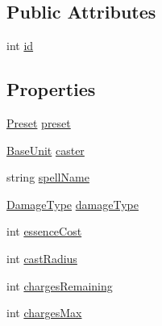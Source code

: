 \subsection*{Public Attributes}
\begin{DoxyCompactItemize}
\item 
int \mbox{\hyperlink{class_spell_abb6d2a96c06ac7e85d1e315e257a106a}{id}}
\end{DoxyCompactItemize}
\subsection*{Properties}
\begin{DoxyCompactItemize}
\item 
\mbox{\hyperlink{class_spell_a5520e850e7000a6156b3456672b72ed1}{Preset}} \mbox{\hyperlink{class_spell_a5f19de819de784c8f273d52417009f54}{preset}}
\item 
\mbox{\hyperlink{class_base_unit}{Base\+Unit}} \mbox{\hyperlink{class_spell_a682bd6dfb1e3dd20ef44711ca10c0f05}{caster}}
\item 
string \mbox{\hyperlink{class_spell_a57762a8a1ff7a3b2c901fedc517035e9}{spell\+Name}}
\item 
\mbox{\hyperlink{class_spell_a3e228beaf92e2c035e6599aaf0ac2d2a}{Damage\+Type}} \mbox{\hyperlink{class_spell_ac71023a2630008b8f2e428caf7cc9251}{damage\+Type}}
\item 
int \mbox{\hyperlink{class_spell_a213cc910c2cc43b2ac27d4524c90722c}{essence\+Cost}}
\item 
int \mbox{\hyperlink{class_spell_aa868e1b844177f20440e0b15f7d42692}{cast\+Radius}}
\item 
int \mbox{\hyperlink{class_spell_a8d79659cf4a135d0f8e859e07c695df9}{charges\+Remaining}}
\item 
int \mbox{\hyperlink{class_spell_a13096b0c79d853c52e9d69ff6c913563}{charges\+Max}}

\end{DoxyCompactItemize}
